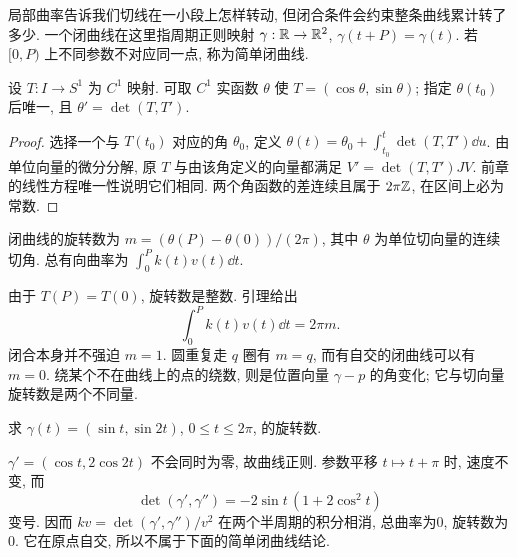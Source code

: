 局部曲率告诉我们切线在一小段上怎样转动, 但闭合条件会约束整条曲线累计转了多少. 一个闭曲线在这里指周期正则映射 $\gamma:\mathbb R\to\mathbb R^2$, $\gamma(t+P)=\gamma(t)$. 若 $[0,P)$ 上不同参数不对应同一点, 称为简单闭曲线.
\begin{lemma}\label{lem:angle}
设 $T:I\to S^1$ 为 $C^1$ 映射. 可取 $C^1$ 实函数 $\theta$ 使 $T=(\cos\theta,\sin\theta)$; 指定 $\theta(t_0)$ 后唯一, 且 $\theta'=\det(T,T')$.
\end{lemma}
\begin{proof}
选择一个与 $T(t_0)$ 对应的角 $\theta_0$, 定义 $\theta(t)=\theta_0+\int_{t_0}^t\det(T,T')\dd u$. 由单位向量的微分分解, 原 $T$ 与由该角定义的向量都满足 $V'=\det(T,T')JV$. 前章的线性方程唯一性说明它们相同. 两个角函数的差连续且属于 $2\pi\mathbb Z$, 在区间上必为常数.
\end{proof}
\begin{definition}
闭曲线的旋转数为 $m=(\theta(P)-\theta(0))/(2\pi)$, 其中 $\theta$ 为单位切向量的连续切角. 总有向曲率为 $\int_0^P k(t)v(t)\dd t$.
\end{definition}
由于 $T(P)=T(0)$, 旋转数是整数. 引理给出
\begin{equation}\label{eq:turning}
 \int_0^P k(t)v(t)\dd t=2\pi m.
\end{equation}
闭合本身并不强迫 $m=1$. 圆重复走 $q$ 圈有 $m=q$, 而有自交的闭曲线可以有 $m=0$. 绕某个不在曲线上的点的绕数, 则是位置向量 $\gamma-p$ 的角变化; 它与切向量旋转数是两个不同量.
\begin{example}
求 $\gamma(t)=(\sin t,\sin 2t)$, $0\le t\le2\pi$, 的旋转数.
\end{example}
\begin{solution}
$\gamma'=(\cos t,2\cos2t)$ 不会同时为零, 故曲线正则. 参数平移 $t\mapsto t+\pi$ 时, 速度不变, 而
\[
 \det(\gamma',\gamma'')=-2\sin t\,(1+2\cos^2t)
\]
变号. 因而 $kv=\det(\gamma',\gamma'')/v^2$ 在两个半周期的积分相消, 总曲率为0, 旋转数为0. 它在原点自交, 所以不属于下面的简单闭曲线结论.
\end{solution}
\begin{center}
\end{center}
